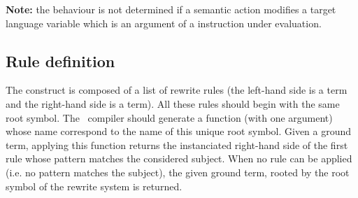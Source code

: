 \noindent
\textbf{Note:} the behaviour is not determined if a semantic action
modifies a target language variable which is an argument of a
 instruction under evaluation.

\subsection{Rule definition}

The  construct is composed of a list of rewrite rules
(the left-hand side is a term and the right-hand side is a term).
All these rules should begin with the same root symbol. The \TOM\
compiler should generate a function (with one argument) whose name
correspond to the name of this unique root symbol.
Given a ground term, applying this function returns the instanciated
right-hand side of the first rule whose pattern matches the considered 
subject.
When no rule can be applied (i.e. no pattern matches the subject),
the given ground term, rooted by the root symbol of the rewrite system
is returned.
